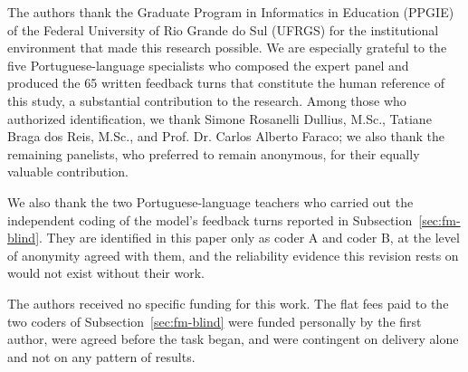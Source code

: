 \documentclass{sbc2023}%
\begin{document}
\begin{acknowledgements}
The authors thank the Graduate Program in Informatics in Education (PPGIE) of the Federal University of Rio Grande do Sul (UFRGS) for the institutional environment that made this research possible. We are especially grateful to the five Portuguese-language specialists who composed the expert panel and produced the 65 written feedback turns that constitute the human reference of this study, a substantial contribution to the research. Among those who authorized identification, we thank Simone Rosanelli Dullius, M.Sc., Tatiane Braga dos Reis, M.Sc., and Prof. Dr. Carlos Alberto Faraco; we also thank the remaining panelists, who preferred to remain anonymous, for their equally valuable contribution.


We also thank the two Portuguese-language teachers who carried out the independent coding of the model's feedback turns reported in Subsection~\ref{sec:fm-blind}. They are identified in this paper only as coder A and coder B, at the level of anonymity agreed with them, and the reliability evidence this revision rests on would not exist without their work.
\end{acknowledgements}

\begin{funding}
The authors received no specific funding for this work. The flat fees paid to the two coders of Subsection~\ref{sec:fm-blind} were funded personally by the first author, were agreed before the task began, and were contingent on delivery alone and not on any pattern of results.
\end{funding}
\end{document}
